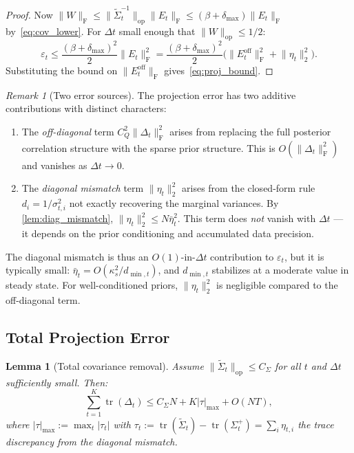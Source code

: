 \documentclass{article}
\theoremstyle{plain}
\newtheorem{lemma}[theorem]{Lemma}
\theoremstyle{definition}
\theoremstyle{remark}
\newtheorem{remark}[theorem]{Remark}
\DeclareMathOperator{\tr}{tr}
\newcommand{\norm}[1]{\lVert #1 \rVert}
\newcommand{\fnorm}[1]{\lVert #1 \rVert_{\mathrm{F}}}
\newcommand{\opnorm}[1]{\lVert #1 \rVert_{\mathrm{op}}}
\begin{document}
\begin{proof}
Now $\fnorm{W} \leq \opnorm{\widetilde{\Sigma}_t^{-1}}\fnorm{E_t} \leq (\beta + \delta_{\max})\fnorm{E_t}$ by~\eqref{eq:cov_lower}. For $\Delta t$ small enough that $\opnorm{W} \leq 1/2$:
\[
\varepsilon_t \leq \frac{(\beta+\delta_{\max})^2}{2}\fnorm{E_t}^2 = \frac{(\beta+\delta_{\max})^2}{2}\bigl(\fnorm{E_t^{\mathrm{off}}}^2 + \norm{\eta_t}_2^2\bigr).
\]
Substituting the bound on $\fnorm{E_t^{\mathrm{off}}}$ gives~\eqref{eq:proj_bound}.
\end{proof}

\begin{remark}[Two error sources]
\label{rem:two_sources}
The projection error has two additive contributions with distinct characters:
\begin{enumerate}
\item The \emph{off-diagonal} term $C_Q^2\fnorm{\Delta_t}^2$ arises from replacing the full posterior correlation structure with the sparse prior structure. This is $O(\fnorm{\Delta_t}^2)$ and vanishes as $\Delta t \to 0$.
\item The \emph{diagonal mismatch} term $\norm{\eta_t}_2^2$ arises from the closed-form rule $d_i = 1/\sigma_{t,i}^2$ not exactly recovering the marginal variances. By \cref{lem:diag_mismatch}, $\norm{\eta_t}_2^2 \leq N\bar{\eta}_t^2$. This term does \emph{not} vanish with $\Delta t$ --- it depends on the prior conditioning and accumulated data precision.
\end{enumerate}
The diagonal mismatch is thus an $O(1)$-in-$\Delta t$ contribution to $\varepsilon_t$, but it is typically small: $\bar{\eta}_t = O(\kappa_s^2/d_{\min,t})$, and $d_{\min,t}$ stabilizes at a moderate value in steady state. For well-conditioned priors, $\norm{\eta_t}_2^2$ is negligible compared to the off-diagonal term.
\end{remark}

\subsection{Total Projection Error}
\label{app:mm-total}

\begin{lemma}[Total covariance removal]
\label{lem:total_cov}
Assume $\opnorm{\widetilde{\Sigma}_t} \leq C_\Sigma$ for all $t$ and $\Delta t$ sufficiently small. Then:
\begin{equation}\label{eq:total_trace}
\sum_{t=1}^K \tr(\Delta_t) \leq C_\Sigma N + K|\tau|_{\max} + O(N T),
\end{equation}
where $|\tau|_{\max} := \max_t |\tau_t|$ with $\tau_t := \tr(\widetilde{\Sigma}_t) - \tr(\Sigma_t^+) = \sum_i \eta_{t,i}$ the trace discrepancy from the diagonal mismatch.
\end{lemma}
\end{document}
